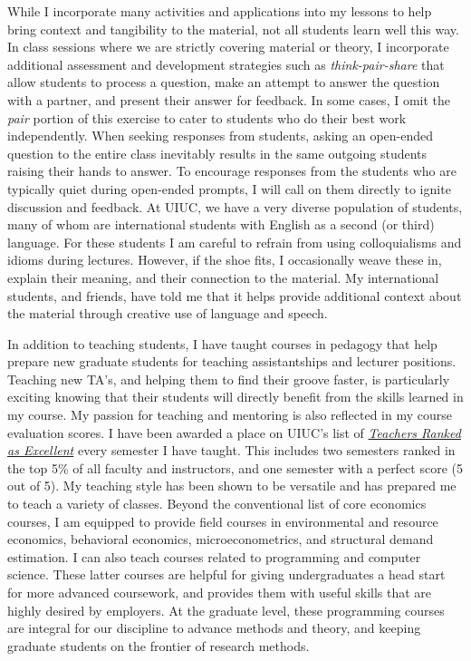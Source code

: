 \documentclass[12pt]{article}
\begin{document}
While I incorporate many activities and applications into my lessons to help bring context and tangibility to the material, not all students learn well this way. In class sessions where we are strictly covering material or theory, I incorporate additional assessment and development strategies such as \textit{think-pair-share} that allow students to process a question, make an attempt to answer the question with a partner, and present their answer for feedback. In some cases, I omit the \textit{pair} portion of this exercise to cater to students who do their best work independently. When seeking responses from students, asking an open-ended question to the entire class inevitably results in the same outgoing students raising their hands to answer. To encourage responses from the students who are typically quiet during open-ended prompts, I will call on them directly to ignite discussion and feedback. At UIUC, we have a very diverse population of students, many of whom are international students with English as a second (or third) language. For these students I am careful to refrain from using colloquialisms and idioms during lectures. However, if the shoe fits, I occasionally weave these in, explain their meaning, and their connection to the material. My international students, and friends, have told me that it helps provide additional context about the material through creative use of language and speech.

In addition to teaching students, I have taught courses in pedagogy that help prepare new graduate students for teaching assistantships and lecturer positions. Teaching new TA's, and helping them to find their groove faster, is particularly exciting knowing that their students will directly benefit from the skills learned in my course. My passion for teaching and mentoring is also reflected in my course evaluation scores. I have been awarded a place on UIUC's list of \textit{\href{https://citl.illinois.edu/citl-101/measurement-evaluation/teaching-evaluation/teaching-evaluations-(ices)/teachers-ranked-as-excellent}{Teachers Ranked as Excellent}} every semester I have taught. This includes two semesters ranked in the top 5\% of all faculty and instructors, and one semester with a perfect score (5 out of 5). My teaching style has been shown to be versatile and has prepared me to teach a variety of classes. Beyond the conventional list of core economics courses, I am equipped to provide field courses in environmental and resource economics, behavioral economics, microeconometrics, and structural demand estimation. I can also teach courses related to programming and computer science. These latter courses are helpful for giving undergraduates a head start for more advanced coursework, and provides them with useful skills that are highly desired by employers. At the graduate level, these programming courses are integral for our discipline to advance methods and theory, and keeping graduate students on the frontier of research methods.
\end{document}
